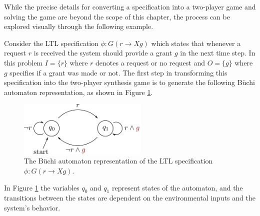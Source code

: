 While the precise details for converting a specification into a two-player game and solving the game are beyond the scope of this chapter, the process can be explored visually through the following example.

\begin{example} \label{ex:simplereactivesynth}
Consider the LTL specification $\phi: G(r \to X g)$ which states that whenever a request $r$ is received the system should provide a grant $g$ in the next time step. In this problem $I = \{r\}$ where $r$ denotes a request or no request and $O = \{g\}$ where $g$ specifies if a grant was made or not. The first step in transforming this specification into the two-player synthesis game is to generate the following B\"{u}chi automaton representation, as shown in Figure \ref{fig:automaton}.
\begin{figure}[ht]
\begin{center}
\includegraphics[width=0.55\textwidth]{tex/figs/ch25_figs/automaton.png}
\caption{The B\"{u}chi automaton representation of the LTL specification $\phi: G(r \to X g)$.}
\label{fig:automaton}
\end{center}
\end{figure}
In Figure \ref{fig:automaton} the variables $q_0$ and $q_1$ represent states of the automaton, and the transitions between the states are dependent on the environmental inputs and the system's behavior.


\end{example}
